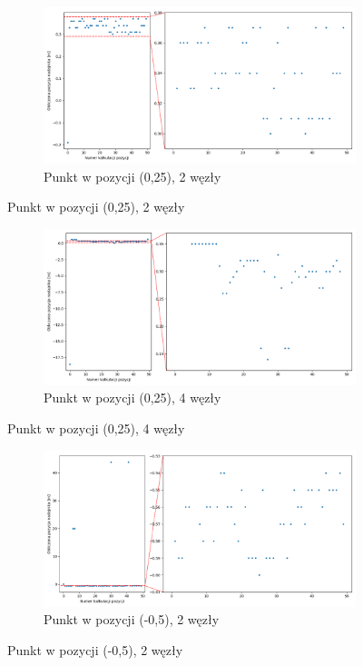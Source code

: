 \begin{figure}[H]
    \ContinuedFloat\centering
    \begin{subfigure}{\textwidth}
        \centering
        \includegraphics[width=\linewidth]{pics/mult_lat_1d/position_[0.25]_2.png}
        \caption{Punkt w pozycji (0,25), 2 węzły}
        \label{pic:1d_mult_[0.25]_2}
    \end{subfigure}
\end{figure}
\begin{figure}[H]
    \ContinuedFloat\centering
    \begin{subfigure}{\textwidth}
        \centering
        \includegraphics[width=\linewidth]{pics/mult_lat_1d/position_[0.25]_4.png}
        \caption{Punkt w pozycji  (0,25), 4 węzły}
        \label{pic:1d_mult_[0.25]_4}
    \end{subfigure}
\end{figure}
\begin{figure}[H]
    \ContinuedFloat\centering
    \begin{subfigure}{\textwidth}
        \centering
        \includegraphics[width=\linewidth]{pics/mult_lat_1d/position_[-0.5]_2.png}
        \caption{Punkt w pozycji  (-0,5), 2 węzły}
        \label{pic:1d_mult_[-0.5]_2}
    \end{subfigure}
\end{figure}
